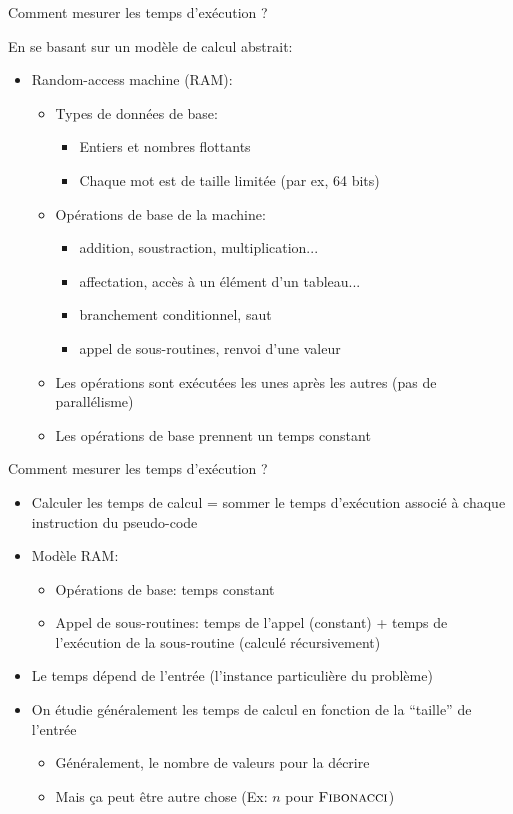 \begin{frame}{Comment mesurer les temps d'exécution ?}

En se basant sur un modèle de calcul abstrait:
\begin{itemize}
\item Random-access machine (RAM):
\begin{itemize}
\item Types de données de base:
\begin{itemize}
\item Entiers et nombres flottants
\item Chaque mot est de taille limitée (par ex, 64 bits)
\end{itemize}
\item Opérations de base de la machine:
\begin{itemize}
\item addition, soustraction, multiplication...
\item affectation, accès à un élément d'un tableau...
\item branchement conditionnel, saut
\item appel de sous-routines, renvoi d'une valeur
\end{itemize}
\item Les opérations sont exécutées les unes après les autres (pas de parallélisme)
\item \alert{Les opérations de base prennent un temps constant}
\end{itemize}
\end{itemize}
\end{frame}

\begin{frame}{Comment mesurer les temps d'exécution ?}
\begin{itemize}
\item Calculer les temps de calcul = sommer le temps d'exécution associé à chaque instruction du pseudo-code
\item Modèle RAM:
\begin{itemize}
\item Opérations de base: temps constant
\item Appel de sous-routines: temps de l'appel (constant) + temps de l'exécution de la sous-routine (calculé récursivement)
\end{itemize}

\bigskip

\item Le temps dépend de l'entrée (l'instance particulière du problème)
\item On étudie généralement les temps de calcul en fonction de la \alert{``taille''} de l'entrée
\begin{itemize}
\item Généralement, le nombre de valeurs pour la décrire
\item Mais ça peut être autre chose (Ex: $n$ pour $\textnormal{\scshape Fibonacci}$)
\end{itemize}
\end{itemize}

\end{frame}

